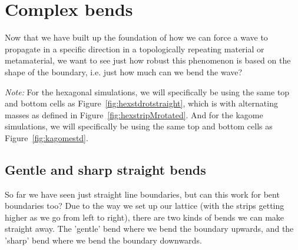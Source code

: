 \section{Complex bends}
\label{complexbends}
Now that we have built up the foundation of how we can force a wave to
propagate in a specific direction in a topologically repeating material or
metamaterial, we want to see just how robust this phenomenon is based on the
shape of the boundary, i.e. just how much can we bend the wave?

\textit{Note:} For the hexagonal simulations, we will specifically be using the
same top and bottom cells as Figure~\ref{fig:hexstdrotstraight}, which is with
alternating masses as defined in Figure~\ref{fig:hexstripMrotated}. And for the
kagome simulations, we will specifically be using the same top and bottom cells
as Figure~\ref{fig:kagomestd}.

\subsection{Gentle and sharp straight bends}
So far we have seen just straight line boundaries, but can this work for bent
boundaries too? Due to the way we set up our lattice (with the strips getting
higher as we go from left to right), there are two kinds of bends we can make
straight away. The 'gentle' bend where we bend the boundary upwards, and the
'sharp' bend where we bend the boundary downwards.

